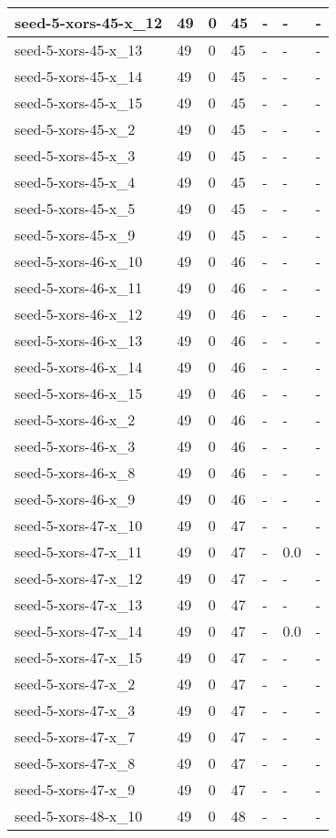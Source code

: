 \begin{scriptsize}
\begin{longtable}{|p{5cm}|l|l|l|l|l|l|}
seed-5-xors-45-x\_12&49&0&45&-&-&- \\ \hline 
seed-5-xors-45-x\_13&49&0&45&-&-&- \\ \hline 
seed-5-xors-45-x\_14&49&0&45&-&-&- \\ \hline 
seed-5-xors-45-x\_15&49&0&45&-&-&- \\ \hline 
seed-5-xors-45-x\_2&49&0&45&-&-&- \\ \hline 
seed-5-xors-45-x\_3&49&0&45&-&-&- \\ \hline 
seed-5-xors-45-x\_4&49&0&45&-&-&- \\ \hline 
seed-5-xors-45-x\_5&49&0&45&-&-&- \\ \hline 
seed-5-xors-45-x\_9&49&0&45&-&-&- \\ \hline 
seed-5-xors-46-x\_10&49&0&46&-&-&- \\ \hline 
seed-5-xors-46-x\_11&49&0&46&-&-&- \\ \hline 
seed-5-xors-46-x\_12&49&0&46&-&-&- \\ \hline 
seed-5-xors-46-x\_13&49&0&46&-&-&- \\ \hline 
seed-5-xors-46-x\_14&49&0&46&-&-&- \\ \hline 
seed-5-xors-46-x\_15&49&0&46&-&-&- \\ \hline 
seed-5-xors-46-x\_2&49&0&46&-&-&- \\ \hline 
seed-5-xors-46-x\_3&49&0&46&-&-&- \\ \hline 
seed-5-xors-46-x\_8&49&0&46&-&-&- \\ \hline 
seed-5-xors-46-x\_9&49&0&46&-&-&- \\ \hline 
seed-5-xors-47-x\_10&49&0&47&-&-&- \\ \hline 
seed-5-xors-47-x\_11&49&0&47&-&0.0&- \\ \hline 
seed-5-xors-47-x\_12&49&0&47&-&-&- \\ \hline 
seed-5-xors-47-x\_13&49&0&47&-&-&- \\ \hline 
seed-5-xors-47-x\_14&49&0&47&-&0.0&- \\ \hline 
seed-5-xors-47-x\_15&49&0&47&-&-&- \\ \hline 
seed-5-xors-47-x\_2&49&0&47&-&-&- \\ \hline 
seed-5-xors-47-x\_3&49&0&47&-&-&- \\ \hline 
seed-5-xors-47-x\_7&49&0&47&-&-&- \\ \hline 
seed-5-xors-47-x\_8&49&0&47&-&-&- \\ \hline 
seed-5-xors-47-x\_9&49&0&47&-&-&- \\ \hline 
seed-5-xors-48-x\_10&49&0&48&-&-&- \\ \hline 

\end{longtable}
\end{scriptsize}
